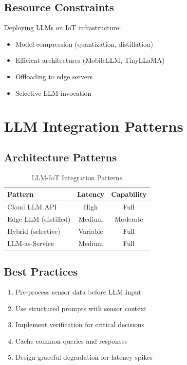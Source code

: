 \documentclass[12pt,a4paper]{article}
\begin{document}
\subsection{Resource Constraints}

Deploying LLMs on IoT infrastructure:
\begin{itemize}
    \item Model compression (quantization, distillation)
    \item Efficient architectures (MobileLLM, TinyLLaMA)
    \item Offloading to edge servers
    \item Selective LLM invocation
\end{itemize}

\section{LLM Integration Patterns}

\subsection{Architecture Patterns}

\begin{table}[H]
\centering
\caption{LLM-IoT Integration Patterns}
\begin{tabular}{lcc}
\toprule
\textbf{Pattern} & \textbf{Latency} & \textbf{Capability} \\
\midrule
Cloud LLM API & High & Full \\
Edge LLM (distilled) & Medium & Moderate \\
Hybrid (selective) & Variable & Full \\
LLM-as-Service & Medium & Full \\
\bottomrule
\end{tabular}
\end{table}

\subsection{Best Practices}

\begin{enumerate}
    \item Pre-process sensor data before LLM input
    \item Use structured prompts with sensor context
    \item Implement verification for critical decisions
    \item Cache common queries and responses
    \item Design graceful degradation for latency spikes
\end{enumerate}
\end{document}
